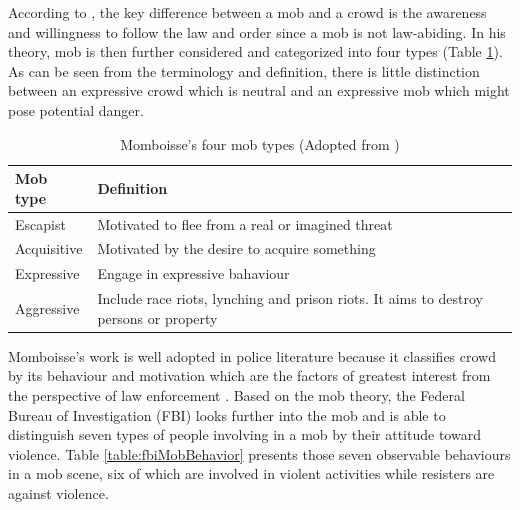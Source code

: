 According to \citet{Momboisse1967}, the key difference between a mob and a crowd is the awareness and willingness to follow the law and order since a mob is not law-abiding. In his theory, mob is then further considered and categorized into four types (Table \ref{table:momboisseMobType}). As can be seen from the terminology and definition, there is little distinction between an expressive crowd which is neutral and an expressive mob which might pose potential danger.

\begin{table}
	\caption{Momboisse's four mob types (Adopted from \citet{Schweingruber2000})}
	\label{table:momboisseMobType}
	\centering
	\begin{tabular}{|l|p{10cm}|}
		\hline
		\textbf{Mob type} & \textbf{Definition} \\ \hline \hline
		Escapist & Motivated to flee from a real or imagined threat \\ \hline
		Acquisitive &  Motivated by the desire to acquire something \\ \hline
		Expressive & Engage in expressive bahaviour \\ \hline
		Aggressive & Include race riots, lynching and prison riots. It aims to destroy persons or property \\ \hline
	\end{tabular}
\end{table}


Momboisse’s work is well adopted in police literature because it classifies crowd by its behaviour and motivation which are the factors of greatest interest from the perspective of law enforcement \citep{FBI1967}. Based on the mob theory, the Federal Bureau of Investigation (FBI) looks further into the mob and is able to distinguish seven types of people involving in a mob by their attitude toward violence. Table \ref{table:fbiMobBehavior} presents those seven observable behaviours in a mob scene, six of which are involved in violent activities while resisters are against violence.

